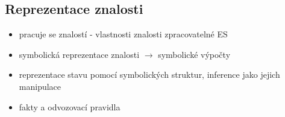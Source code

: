 \subsection{Reprezentace znalosti}

\begin{framed}
  \begin{itemize}
    \item pracuje se znalostí - vlastnosti znalosti zpracovatelné ES
    \item symbolická reprezentace znalosti $\rightarrow$ symbolické výpočty
    \item reprezentace stavu pomocí symbolických struktur, inference jako jejich manipulace
    \item fakty a odvozovací pravidla
  \end{itemize}
\end{framed}
